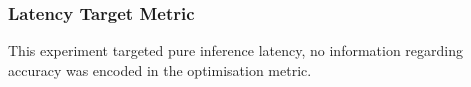 \documentclass[../Dissertation.tex]{subfiles}
\begin{document}
\doublespacing

\subsubsection{Latency Target Metric}
This experiment targeted pure inference latency, no information regarding accuracy was encoded in the optimisation metric. 
\end{document}
